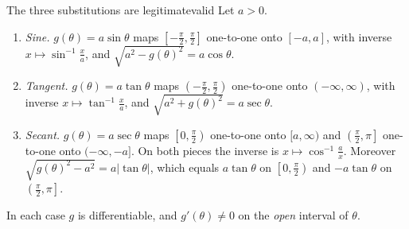 \documentclass[11pt]{article}
\begin{document}
\begin{thm}{The three substitutions are legitimate}{valid}
Let $a>0$.
\begin{enumerate}[label=(\arabic*)]
  \item \emph{Sine.} $g(\theta)=a\sin\theta$ maps $\left[-\frac\pi2,\frac\pi2\right]$ one-to-one onto $[-a,a]$, with inverse $x\mapsto\sin^{-1}\frac xa$, and $\sqrt{a^2-g(\theta)^2}=a\cos\theta$.
  \item \emph{Tangent.} $g(\theta)=a\tan\theta$ maps $\left(-\frac\pi2,\frac\pi2\right)$ one-to-one onto $(-\infty,\infty)$, with inverse $x\mapsto\tan^{-1}\frac xa$, and $\sqrt{a^2+g(\theta)^2}=a\sec\theta$.
  \item \emph{Secant.} $g(\theta)=a\sec\theta$ maps $\left[0,\frac\pi2\right)$ one-to-one onto $[a,\infty)$ and $\left(\frac\pi2,\pi\right]$ one-to-one onto $(-\infty,-a]$. On both pieces the inverse is $x\mapsto\cos^{-1}\frac ax$. Moreover $\sqrt{g(\theta)^2-a^2}=a\lvert\tan\theta\rvert$, which equals $a\tan\theta$ on $\left[0,\frac\pi2\right)$ and $-a\tan\theta$ on $\left(\frac\pi2,\pi\right]$.
\end{enumerate}
In each case $g$ is differentiable, and $g'(\theta)\ne0$ on the \emph{open} interval of $\theta$.
\end{thm}
\end{document}

